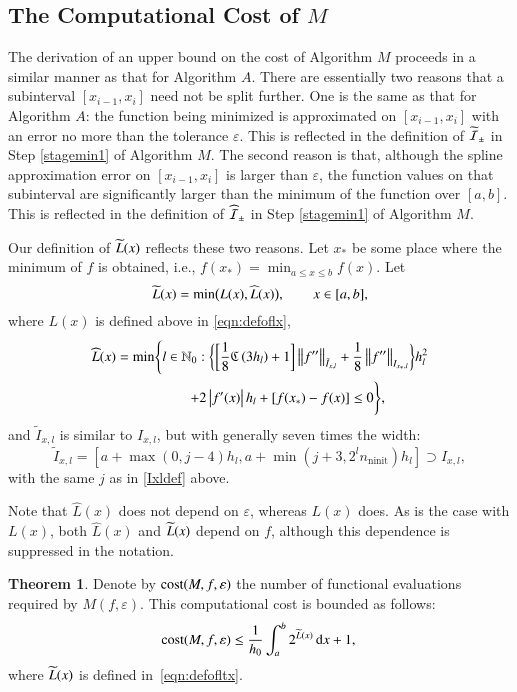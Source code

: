 \documentclass[review]{elsarticle}
\newcommand{\abstol}{\varepsilon}
\theoremstyle{definition}
\newcommand{\Ixl}{I_{x,l}}
\newcommand{\chL}{\widehat{L}}
\DeclareMathOperator{\ninit}{ninit}
\newtheorem{theorem}{Theorem}
\begin{document}
\subsection{The Computational Cost of $M$} \label{subsec:optcost}
The derivation of an upper bound on the cost of Algorithm $M$ proceeds in a
similar manner as that for Algorithm $A$. There are essentially two reasons that a
subinterval $[x_{i-1},x_i]$ need not be split further. One is the same as that
for Algorithm $A$: the function being minimized is approximated on
$[x_{i-1},x_i]$ with an error no more than the tolerance $\abstol$. This is
reflected in the definition of $\widetilde{\mathcal{I}}_{\pm}$ in Step \ref{stagemin1} of Algorithm
$M$.  The second
reason is that, although the spline approximation error on $[x_{i-1},x_i]$ is larger
than $\abstol$, the function values on that subinterval are significantly larger
than the minimum of the function over $[a,b]$.  This is reflected in the definition of
$\widehat{\mathcal{I}}_{\pm}$ in Step \ref{stagemin1} of Algorithm $M$.

Our definition of $\widetilde{L}(x)$ reflects these two reasons. Let $x_*$ be some place
where the minimum of $f$ is obtained, i.e.,
$f(x_*)  = \min_{a \le x \le b} f(x).$
Let
\begin{equation}\label{eqn:defofltx}
\tL(x) = \min\bigl(L(x),\chL(x)\bigr), \qquad x \in [a,b],
\end{equation}
where $L(x)$ is defined above in \eqref{eqn:defoflx},
\begin{multline}\label{eqn:defoflt1x}
\chL(x) = \min \Biggl\{ l \in \mathbb{N}_0 :  \biggl\{ \biggl[\frac 18 \fC\left(3h_l\right) + 1
\biggr]   \norm[\tilde{I}_{x,l}]{f''} + \frac18\norm[{I_{x_*,l}}]{f''} \biggr\} h_{l}^2 \\ \qquad
\qquad +  2 \abs{f'(x)} h_{l} + [f(x_*) - f(x)] \le 0 \Biggr\},
\end{multline}
and $\tilde{I}_{x,l}$ is similar to $\Ixl$, but with generally seven times the width:
\begin{equation}
\tilde{I}_{x,l}=\left[a+\max(0,j-4)h_l, a+ \min(j+3,2^l n_{\ninit})h_l\right] \supset \Ixl,
\end{equation}
with the same $j$ as in \eqref{Ixldef} above.


Note that $\chL(x)$ does not depend on $\abstol$, whereas $L(x)$ does. As is the
case with $L(x)$, both $\chL(x)$ and $\widetilde{L}(x)$ depend on $f$, although this
dependence is suppressed in the notation.

\begin{theorem}\label{thm:Mcost}
	Denote by $\cost(M,f,\abstol)$ the number of functional evaluations required by
	$M(f,\abstol)$. This computational cost is bounded as follows:
	\begin{equation*}
	\cost(M,f,\abstol) \le \frac{1}{h_0}\int_a^b 2^{\tL(x)} \, \dif x +1, \\
	\end{equation*}
	where $\widetilde{L}(x)$ is defined in~\eqref{eqn:defofltx}.
\end{theorem}
\end{document}
